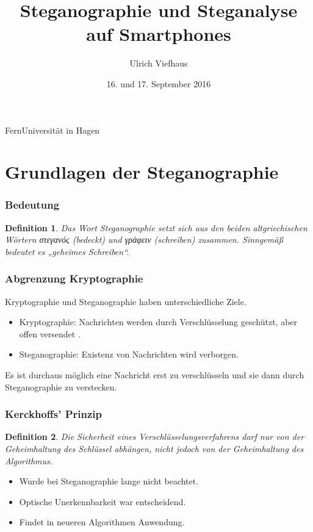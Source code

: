 \documentclass{beamer}
\newtheorem{mydef}{Definition}
\begin{document}
\title{Steganographie und Steganalyse auf Smartphones}
\author{Ulrich Viefhaus}
\institute
{
  FernUniversität in Hagen
}
\date{16. und 17. September 2016}
\subject{Steganographie, Inforation Hiding, Steganalysis}

\frame[allowframebreaks]{\titlepage}

\section{Grundlagen der Steganographie}

\begin{frame}
    \frametitle{Bedeutung}
    \begin{mydef}
    Das Wort Steganographie setzt sich aus den beiden altgriechischen Wörtern \textgreek[variant=ancient]{στεγανός} (bedeckt) und \textgreek[variant=ancient]{γράφειν} (schreiben) zusammen. Sinngemäß bedeutet es „geheimes Schreiben“.
  \end{mydef}
\end{frame}

\begin{frame}
    \frametitle{Abgrenzung Kryptographie}
    Kryptographie und Steganographie haben unterschiedliche Ziele.
	  \begin{itemize}
	    \item Kryptographie: Nachrichten werden durch Verschlüsselung geschützt, aber offen versendet .
	    \item Steganographie: Existenz von Nachrichten wird verborgen.
	  \end{itemize}
	  Es ist durchaus möglich eine Nachricht erst zu verschlüsseln und sie dann durch Steganographie zu verstecken.
\end{frame}
  
\begin{frame}
    \frametitle{Kerckhoffs' Prinzip}
    \begin{mydef}
      Die Sicherheit eines Verschlüsselungsverfahrens darf nur von der Geheimhaltung des Schlüssel abhängen, nicht jedoch von der Geheimhaltung des Algorithmus.
  \end{mydef}
    \begin{itemize}
      \item Wurde bei Steganographie lange nicht beachtet.
      \item Optische Unerkennbarkeit war entscheidend.
      \item Findet in neueren Algorithmen Anwendung.
    \end{itemize}
\end{frame}
\end{document}
